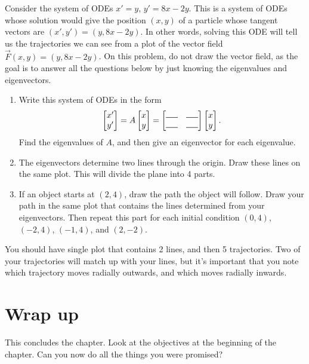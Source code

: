 \begin{problem}
Consider the system of ODEs $x'=y$, $y'=8x-2y$. This is a system of ODEs whose solution would give the position $(x,y)$ of a particle whose tangent vectors are $(x',y') = (y, 8x-2y)$.  In other words, solving this ODE will tell us the trajectories we can see from a plot of the vector field  $\vec F(x,y)=(y, 8x-2y)$. 
%
On this problem, do not draw the vector field, as the goal is to answer all the questions below by just knowing the eigenvalues and eigenvectors.  
\begin{enumerate}
 \item Write this system of ODEs in the form 
$$\bvec{x'\\y'}=A\bvec{x\\y}=\bvec{\rule{.5cm}{.5pt}&\rule{.5cm}{.5pt}\\ \rule{.5cm}{.5pt}&\rule{.5cm}{.5pt}}\bvec{x\\y}.$$  
 Find the eigenvalues of $A$, and then give an eigenvector for each eigenvalue.
 \item The eigenvectors determine two lines through the origin.  Draw these lines on the same plot. This will divide the plane into 4 parts.
 \item If an object starts at $(2,4)$, draw the path the object will follow. Draw your path in the same plot that contains the lines determined from your eigenvectors. Then repeat this part for each initial condition $(0,4)$, $(-2,4)$, $(-1,4)$, and $(2,-2)$. 
\end{enumerate}
You should have single plot that contains 2 lines, and then 5 trajectories. Two of your trajectories will match up with your lines, but it's important that you note which trajectory moves radially outwards, and which moves radially inwards.
\end{problem}




\section*{Wrap up}

This concludes the chapter.  Look at the objectives at the beginning of the chapter. Can you now do all the things you were promised? 


